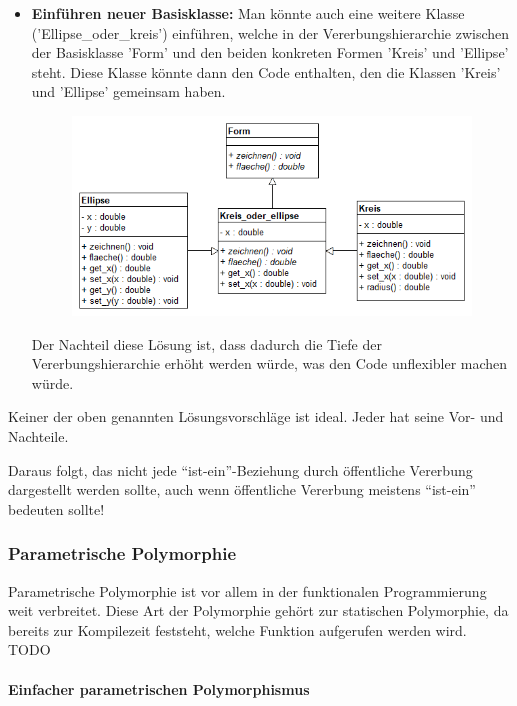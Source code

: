 \begin{itemize}
						\item {\bfseries Einführen neuer Basisklasse:}
							Man könnte auch eine weitere Klasse ('Ellipse\_oder\_kreis') einführen, welche in der Vererbungshierarchie zwischen der
							Basisklasse 'Form' und den beiden konkreten Formen 'Kreis' und 'Ellipse' steht. Diese Klasse
							könnte dann den Code enthalten, den die Klassen 'Kreis' und 'Ellipse' gemeinsam haben.
							\begin{figure}[H]
								\includegraphics[scale=0.6]{polymorphie/universell/vererbung/ellipse-kreis-problem/loesungen/einfuehren_neuer_basisklasse.png}
							\end{figure}
							Der Nachteil diese Lösung ist, dass dadurch die Tiefe der Vererbungshierarchie erhöht werden würde,
							was den Code unflexibler machen würde.
					\end{itemize}
					
					Keiner der oben genannten Lösungsvorschläge ist ideal. Jeder hat seine Vor- und Nachteile.
					
					Daraus folgt, das nicht jede ``ist-ein''-Beziehung durch öffentliche Vererbung dargestellt
					werden sollte, auch wenn öffentliche Vererbung meistens ``ist-ein'' bedeuten sollte!
			
		\subsubsection{Parametrische Polymorphie}
			Parametrische Polymorphie ist vor allem in der funktionalen Programmierung weit verbreitet. Diese Art der
			Polymorphie gehört zur statischen Polymorphie, da bereits zur Kompilezeit feststeht, welche Funktion aufgerufen
			werden wird.
			TODO
			\paragraph{Einfacher parametrischen Polymorphismus}\mbox{}\\
			
